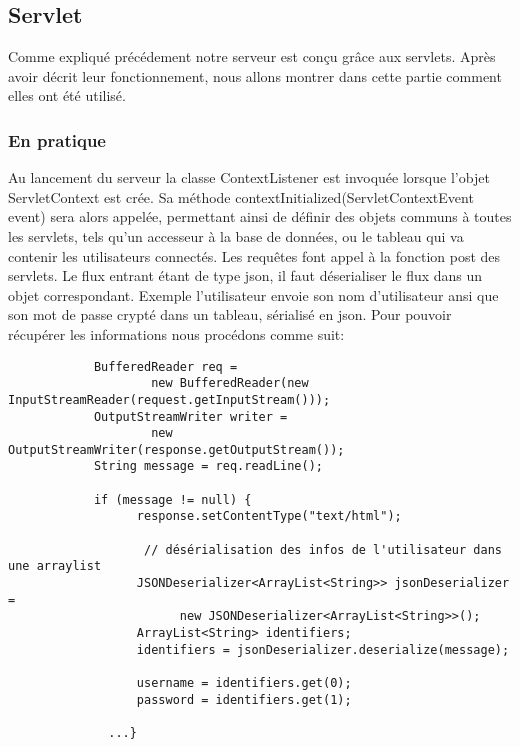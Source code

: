 
		
	
		
\subsection{Servlet}
	
		Comme expliqué précédement notre serveur est conçu grâce aux \glspl{servlet}.
		Après avoir décrit leur fonctionnement, nous allons montrer dans cette partie
		comment elles ont été utilisé.
		
	\subsubsection{En pratique}
		Au lancement du serveur la classe ContextListener est invoquée lorsque l'objet
		ServletContext est crée. Sa méthode contextInitialized(ServletContextEvent event) sera alors appelée, 
		permettant ainsi de définir des objets communs à toutes les
		\glspl{servlet}, tels qu'un accesseur à la base de données, ou le tableau qui va
		contenir les utilisateurs connectés.	
		Les requêtes font appel à la fonction post des \glspl{servlet}. Le flux entrant étant
		de type \gls{json}, il faut déserialiser le flux dans un objet correspondant. Exemple
		l'utilisateur envoie son nom d'utilisateur ansi que son mot de passe crypté
		dans un tableau, sérialisé en \gls{json}.
		Pour pouvoir récupérer les informations nous procédons comme suit: 
		
		\begin{verbatim}
			BufferedReader req = 
				    new BufferedReader(new InputStreamReader(request.getInputStream()));
			OutputStreamWriter writer = 
				    new OutputStreamWriter(response.getOutputStream());
			String message = req.readLine();
			
			if (message != null) {
				  response.setContentType("text/html");
				
				   // désérialisation des infos de l'utilisateur dans une arraylist 
				  JSONDeserializer<ArrayList<String>> jsonDeserializer = 
					    new JSONDeserializer<ArrayList<String>>();
				  ArrayList<String> identifiers;
				  identifiers = jsonDeserializer.deserialize(message);
				
				  username = identifiers.get(0);
				  password = identifiers.get(1);
				  
			  ...}
		\end{verbatim}
		
